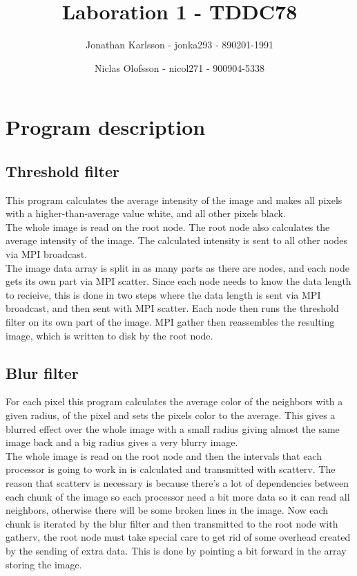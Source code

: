 \documentclass[a4paper]{article}
\author{Jonathan Karlsson - jonka293 - 890201-1991 \and Niclas Olofsson - nicol271 - 900904-5338}
\title{Laboration 1 - TDDC78}
\begin{document}
\maketitle

\section{Program description}
\subsection{Threshold filter}

This program calculates the average intensity of the image and makes all
pixels with a higher-than-average value white, and all other pixels
black.\\

The whole image is read on the root node. The root node also calculates
the  average intensity of the image. The calculated intensity is sent to
all other nodes via MPI broadcast.\\

The image data array is split in as many parts as there are nodes, and
each node gets its own part via MPI scatter. Since each node needs to
know  the data length to recieive, this is done in two steps where the
data length is  sent via MPI broadcast, and then sent with MPI scatter.
Each node then runs the threshold filter on its own part of the image.
MPI gather then reassembles the resulting image, which is written to
disk by the root node.\\

\subsection{Blur filter}
For each pixel this program calculates the average color of the neighbors with a given radius, of the pixel and sets the pixels color to the average. This gives a blurred effect over the whole image with a small radius giving almost the same image back and a big radius gives a very blurry image.\\

 The whole image is read on the root node and then the intervals that each processor is going to work in is calculated and transmitted with scatterv. The reason that scatterv is necessary is because there\rq{}s a lot of dependencies between each chunk of the image so each processor need a bit more data so it can read all neighbors, otherwise there will be some broken lines in the image. Now each chunk is iterated by the blur filter and then transmitted to the root node with gatherv, the root node must take special care to get rid of some overhead created by the sending of extra data. This is done by pointing a bit forward in the array storing the image.
\end{document}
